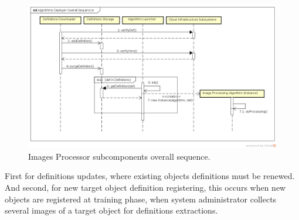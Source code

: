 \begin{figure}[htb!]
 	\centering
 	\includegraphics[scale=0.45]{Imagens/cap4_algseq.png}
 	\caption{Images Processor subcomponents overall sequence.}
 	\label{fig:imgprocseq}
\end{figure}

First for definitions updates, where existing objects definitions must be renewed. And second, for new target object definition registering, this occurs when new objects are registered at training phase, when system administrator collects several images of a target object for definitions extractions. 

%
%
%
%
%



%
%
%
%
%

%
%
%
%
%


